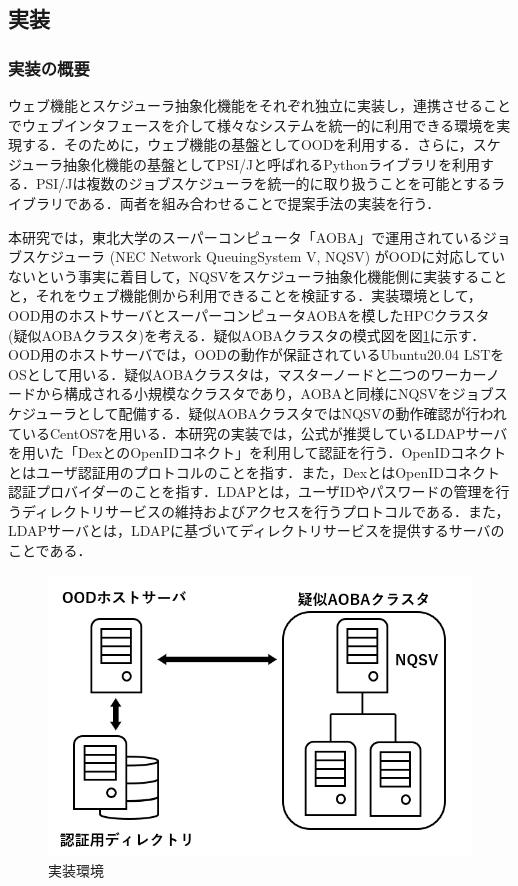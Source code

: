 \subsection{実装}
\subsubsection{実装の概要}
ウェブ機能とスケジューラ抽象化機能をそれぞれ独立に実装し，連携させることでウェブインタフェースを介して様々なシステムを統一的に利用できる環境を実現する．そのために，ウェブ機能の基盤としてOODを利用する．さらに，スケジューラ抽象化機能の基盤としてPSI/J\cite{cite5}と呼ばれるPythonライブラリを利用する．PSI/Jは複数のジョブスケジューラを統一的に取り扱うことを可能とするライブラリである．両者を組み合わせることで提案手法の実装を行う．\par
本研究では，東北大学のスーパーコンピュータ「AOBA」\cite{aoba}で運用されているジョブスケジューラ (NEC Network QueuingSystem V, NQSV) \cite{nqsv_scheduler}がOODに対応していないという事実に着目して，NQSVをスケジューラ抽象化機能側に実装することと，それをウェブ機能側から利用できることを検証する．実装環境として，OOD用のホストサーバとスーパーコンピュータAOBAを模したHPCクラスタ (疑似AOBAクラスタ)を考える．疑似AOBAクラスタの模式図を図\ref{fig7}に示す．OOD用のホストサーバでは，OODの動作が保証されているUbuntu20.04 LSTをOSとして用いる．疑似AOBAクラスタは，マスターノードと二つのワーカーノードから構成される小規模なクラスタであり，AOBAと同様にNQSVをジョブスケジューラとして配備する．疑似AOBAクラスタではNQSVの動作確認が行われているCentOS7を用いる\cite{nqsv_introduction}．本研究の実装では，公式が推奨しているLDAPサーバを用いた「DexとのOpenIDコネクト」を利用して認証を行う\cite{cite7}\cite{cite8}．OpenIDコネクトとはユーザ認証用のプロトコルのことを指す．また，DexとはOpenIDコネクト認証プロバイダーのことを指す．LDAPとは，ユーザIDやパスワードの管理を行うディレクトリサービスの維持およびアクセスを行うプロトコルである．また，LDAPサーバとは，LDAPに基づいてディレクトリサービスを提供するサーバのことである．\par

\begin{figure}[tb]
    \centering
    \includegraphics[width=120mm]{./fig/environment.png}
    \caption{実装環境}
    \label{fig7}
\end{figure}


